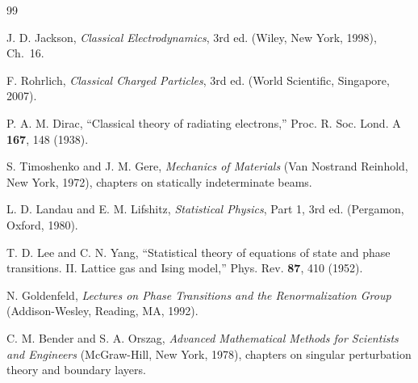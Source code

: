 \documentclass[11pt]{article}
\begin{document}
\begin{thebibliography}{99}

 J. D. Jackson, \emph{Classical Electrodynamics}, 3rd ed. (Wiley, New York, 1998), Ch.~16.

 F. Rohrlich, \emph{Classical Charged Particles}, 3rd ed. (World Scientific, Singapore, 2007).

 P. A. M. Dirac, ``Classical theory of radiating electrons,'' Proc. R. Soc. Lond. A \textbf{167}, 148 (1938).

 S. Timoshenko and J. M. Gere, \emph{Mechanics of Materials} (Van Nostrand Reinhold, New York, 1972), chapters on statically indeterminate beams.

 L. D. Landau and E. M. Lifshitz, \emph{Statistical Physics}, Part 1, 3rd ed. (Pergamon, Oxford, 1980).

 T. D. Lee and C. N. Yang, ``Statistical theory of equations of state and phase transitions. II. Lattice gas and Ising model,'' Phys. Rev. \textbf{87}, 410 (1952).

 N. Goldenfeld, \emph{Lectures on Phase Transitions and the Renormalization Group} (Addison-Wesley, Reading, MA, 1992).

 C. M. Bender and S. A. Orszag, \emph{Advanced Mathematical Methods for Scientists and Engineers} (McGraw-Hill, New York, 1978), chapters on singular perturbation theory and boundary layers.

\end{thebibliography}
\end{document}
